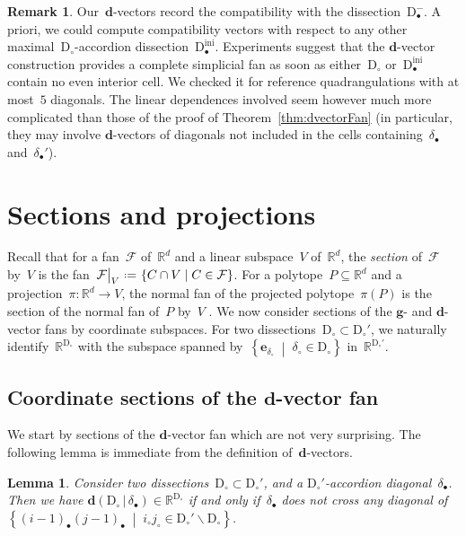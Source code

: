 \documentclass{amsart}
\newtheorem{lemma}[theorem]{Lemma}
\theoremstyle{definition}
\newtheorem{remark}[theorem]{Remark}
\newcommand{\R}{\mathbb{R}} %
\renewcommand{\b}[1]{\mathbf{#1}} %
\newcommand{\set}[2]{\left\{ #1 \;\middle|\; #2 \right\}} %
\newcommand{\ssm}{\smallsetminus} %
\newcommand{\eqdef}{\mbox{\,\raisebox{0.2ex}{\scriptsize\ensuremath{\mathrm:}}\ensuremath{=}\,}} %
\newcommand{\Fan}{\mathcal{F}} %
\newcommand{\darkblue}{\color{darkblue}} %
\newcommand{\defn}[1]{\textsl{\darkblue #1}} %
\newcommand{\dissection}{\mathrm{D}} %
\newcommand{\dvector}[2]{\mathbf{d}(#1 \,|\, #2)} %
\newcommand{\mi}{-} %
\newcommand{\ini}{\mathrm{ini}} %
\renewcommand{\restriction}[2]{\left.\kern-\nulldelimiterspace #1 \vphantom{\big|} \right|_{#2}}
\begin{document}
\begin{remark}
\enlargethispage{.3cm}
Our~$\b{d}$-vectors record the compatibility with the dissection~$\dissection_\bullet^\mi$. A priori, we could compute compatibility vectors with respect to any other maximal~$\dissection_\circ$-accordion dissection~$\dissection^\ini_\bullet$. Experiments suggest that the $\b{d}$-vector construction provides a complete simplicial fan as soon as either~$\dissection_\circ$ or~$\dissection^\ini_\bullet$ contain no even interior cell. We checked it for reference quadrangulations with at most~$5$ diagonals. The linear dependences involved seem however much more complicated than those of the proof of Theorem~\ref{thm:dvectorFan} (in particular, they may involve $\b{d}$-vectors of diagonals not included in the cells containing~$\delta_\bullet$ and~$\delta_\bullet'$).
\end{remark}



\section{Sections and projections}
\label{sec:projection}

Recall that for a fan~$\Fan$ of~$\R^d$ and a linear subspace~$V$ of~$\R^d$, the \defn{section} of~$\Fan$ by~$V$ is the fan~$\restriction{\Fan}{V} \eqdef \set{C \cap V}{C \in \Fan}$. For a polytope~$P \subseteq \R^d$ and a projection~$\pi : \R^d \to V$, the normal fan of the projected polytope~$\pi(P)$ is the section of the normal fan of~$P$ by~$V$ \cite[Lemma~7.11]{Ziegler-polytopes}.
%
We now consider sections of the $\b{g}$- and $\b{d}$-vector fans by coordinate subspaces. For two dissections~${\dissection_\circ \subset \dissection_\circ'}$, we naturally identify~$\R^{\dissection_\circ}$ with the subspace spanned by~$\set{\b{e}_{\delta_\circ}}{\delta_\circ \in \dissection_\circ}$ in~$\R^{\dissection_\circ'}$.

\subsection{Coordinate sections of the $\b{d}$-vector fan}
\label{subsec:sectiondvectors}

We start by sections of the $\b{d}$-vector fan which are not very surprising. The following lemma is immediate from the definition of~$\b{d}$-vectors.

\begin{lemma}
Consider two dissections~$\dissection_\circ \subset \dissection_\circ'$, and a $\dissection_\circ'$-accordion diagonal~$\delta_\bullet$. Then we have ${\dvector{\dissection_\circ}{\delta_\bullet} \in \R^{\dissection_\circ}}$ if and only if~$\delta_\bullet$ does not cross any diagonal of~$\set{(i-1)_\bullet (j-1)_\bullet}{i_\circ j_\circ \in \dissection_\circ' \ssm \dissection_\circ}$.
\end{lemma}
\end{document}
